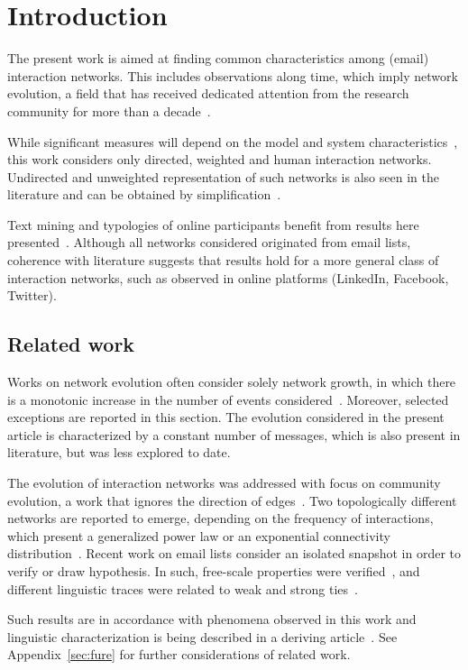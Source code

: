 \documentclass[%
 aip,
 jmp,%
 amsmath,amssymb,
 reprint,%
]{revtex4-1}
\begin{document}
\section{\label{sec:into}Introduction}
The present work is aimed at finding common characteristics among (email) interaction networks. This includes observations along time, which imply network evolution, a field that has received dedicated attention from the research community
for more than a decade~\cite{barabasiEvo,newmanEvolving}.


While significant measures will depend on the model and system characteristics~\cite{newmanStru, newmanWeight},
this work considers only directed, weighted and human interaction networks. Undirected and unweighted representation of such networks is also seen in the literature and can be obtained by simplification~\cite{GMANE2}.

Text mining and typologies of online participants benefit from results here presented~\cite{rcText,rcTipo}. 
Although all networks considered originated from email lists,
 coherence with literature suggests that results hold for a more general class of interaction networks,
 such as observed in online platforms (LinkedIn, Facebook, Twitter).


\subsection{Related work}
 Works on network evolution often consider solely network growth, in which there is a monotonic increase in the number of events considered~\cite{barabasiEvo}. Moreover, selected exceptions are reported in this section.
The evolution considered in the present article is characterized by a constant number of messages, which is also present in literature, but was less explored to date.

 The evolution of interaction networks was addressed with focus on community evolution, a work that ignores the direction of edges~\cite{barabasiEvo}. Two topologically different networks are reported to emerge, depending on the frequency of interactions, which present a generalized power law or an exponential connectivity distribution~\cite{barabasiTopologicalEv}. 
Recent work on email lists consider an isolated snapshot in order to verify or draw hypothesis. In such, free-scale properties were verified~\cite{bird}, and different linguistic traces were related to weak and strong ties~\cite{GMANE2}.

 Such results are in accordance with phenomena observed in this work and linguistic characterization is being described in a deriving article~\cite{rcText}. See Appendix~\ref{sec:fure} for further considerations of related work.
\end{document}
